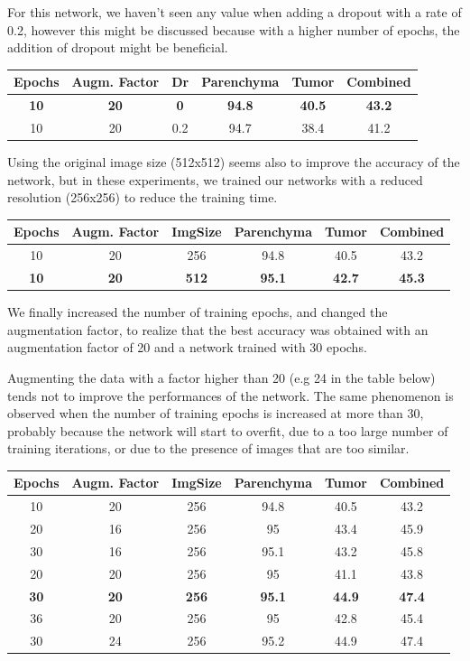 For this network, we haven't seen any value when adding a dropout with a
rate of 0.2, however this might be discussed because with a higher
number of epochs, the addition of dropout might be beneficial.

\begin{longtable}[c]{@{}cccccc@{}}
\toprule
\textbf{Epochs} & \textbf{Augm. Factor} & \textbf{Dr} &
\textbf{Parenchyma} & \textbf{Tumor} & \textbf{Combined}\tabularnewline
\midrule
\endhead
\textbf{10} & \textbf{20} & \textbf{0} & \textbf{94.8} & \textbf{40.5} & \textbf{43.2}\tabularnewline
10 & 20 & 0.2 & 94.7 & 38.4 & 41.2\tabularnewline
\bottomrule
\end{longtable}

Using the original image size (512x512) seems also to improve the
accuracy of the network, but in these experiments, we trained our
networks with a reduced resolution (256x256) to reduce the training
time.

\begin{longtable}[c]{@{}cccccc@{}}
\toprule
\textbf{Epochs} & \textbf{Augm. Factor} & \textbf{ImgSize} &
\textbf{Parenchyma} & \textbf{Tumor} & \textbf{Combined}\tabularnewline
\midrule
\endhead
10 & 20 & 256 & 94.8 & 40.5 & 43.2\tabularnewline
\textbf{10} & \textbf{20} & \textbf{512} & \textbf{95.1} & \textbf{42.7} & \textbf{45.3}\tabularnewline
\bottomrule
\end{longtable}

We finally increased the number of training epochs, and changed the
augmentation factor, to realize that the best accuracy was obtained with
an augmentation factor of 20 and a network trained with 30 epochs.

Augmenting the data with a factor higher than 20 (e.g 24 in the table
below) tends not to improve the performances of the network. The same
phenomenon is observed when the number of training epochs is increased
at more than 30, probably because the network will start to overfit, due
to a too large number of training iterations, or due to the presence of
images that are too similar.

\begin{longtable}[c]{@{}cccccc@{}}
\toprule
\textbf{Epochs} & \textbf{Augm. Factor} & \textbf{ImgSize} &
\textbf{Parenchyma} & \textbf{Tumor} & \textbf{Combined}\tabularnewline
\midrule
\endhead
10 & 20 & 256 & 94.8 & 40.5 & 43.2\tabularnewline
20 & 16 & 256 & 95 & 43.4 & 45.9\tabularnewline
30 & 16 & 256 & 95.1 & 43.2 & 45.8\tabularnewline
20 & 20 & 256 & 95 & 41.1 & 43.8\tabularnewline
\textbf{30} & \textbf{20} & \textbf{256} & \textbf{95.1} & \textbf{44.9} & \textbf{47.4}\tabularnewline
36 & 20 & 256 & 95 & 42.8 & 45.4\tabularnewline
30 & 24 & 256 & 95.2 & 44.9 & 47.4\tabularnewline
\bottomrule
\end{longtable}

